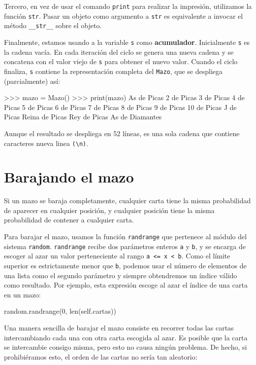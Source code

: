 Tercero, en vez de usar el comando \texttt{print} para realizar la
impresión, utilizamos la función \texttt{str}. Pasar un objeto como
argumento a \texttt{str} es equivalente a invocar el método \texttt{\_\_str\_\_}
sobre el objeto.


Finalmente, estamos usando a la variable \texttt{s} como \textbf{acumulador}.
Inicialmente \texttt{s} es la cadena vacía. En cada iteración del
ciclo se genera una nueva cadena y se concatena con el valor viejo
de \texttt{s} para obtener el nuevo valor. Cuando el ciclo finaliza,
\texttt{s} contiene la representación completa del \texttt{Mazo},
que se despliega (parcialmente) así:

\begin{pyconcode}
>>> mazo = Mazo()
>>> print(mazo)
As de Picas
 2 de Picas
  3 de Picas
   4 de Picas
    5 de Picas
     6 de Picas
      7 de Picas
       8 de Picas
        9 de Picas
         10 de Picas
          J de Picas
           Reina de Picas
            Rey de Picas
             As de Diamantes
\end{pyconcode}
 Aunque el resultado se despliega en 52 líneas, es una sola cadena
que contiene caracteres nueva linea \verb+(\n)+.

\section{Barajando el mazo}


Si un mazo se baraja completamente, cualquier carta tiene la misma
probabilidad de aparecer en cualquier posición, y cualquier posición
tiene la misma probabilidad de contener a cualquier carta.

 

Para barajar el mazo, usamos la función \texttt{randrange} que pertenece
al módulo del sistema \texttt{random}. \texttt{randrange} recibe dos
parámetros enteros \texttt{a} y \texttt{b}, y se encarga de escoger
al azar un valor perteneciente al rango \texttt{a <= x < b}. Como
el límite superior es estrictamente menor que \texttt{b}, podemos
usar el número de elementos de una lista como el segundo parámetro
y siempre obtendremos un índice válido como resultado. Por ejemplo,
esta expresión escoge al azar el índice de una carta en un mazo:

\begin{pythoncode}
random.randrange(0, len(self.cartas))
\end{pythoncode}
 Una manera sencilla de barajar el mazo consiste en recorrer todas
las cartas intercambiando cada una con otra carta escogida al azar.
Es posible que la carta se intercambie consigo misma, pero esto no
causa ningún problema. De hecho, si prohibiéramos esto, el orden de
las cartas no sería tan aleatorio:


